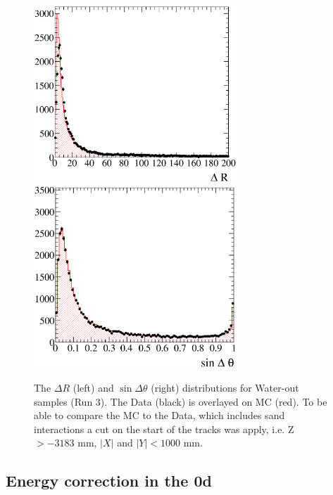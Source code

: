 \begin{figure}
\centering
\includegraphics[width=3in]{Figures/optCut-5FE-Run3air-dR-DoMC.eps}
\includegraphics[width=3in]{Figures/optCut-5FE-Run3air-sinT-DoMC.eps}
\caption{The $\Delta R$ (left) and $\sin\Delta\theta$ (right) 
distributions for Water-out samples (Run 3). 
The Data (black) is overlayed on MC (red). 
To be able to compare the MC to the Data, which includes sand interactions 
a cut on the start of the tracks was apply, i.e. Z $> -3183$ mm, 
$|X|$ and $|Y| < 1000$ mm.}
\label{fig:dRsindTWaterOut}
\end{figure}

\subsection{Energy correction in the \p0d}
\label{sec:EnergyCorrection}

